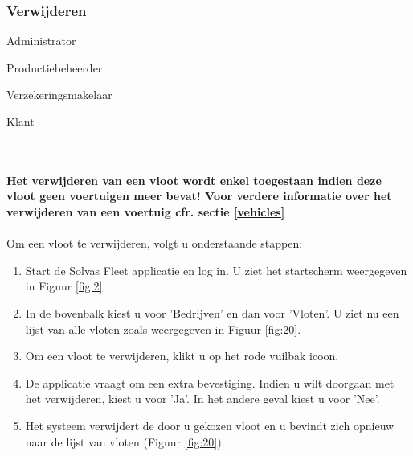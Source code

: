 \documentclass[11pt,openany]{article}
\newcommand{\cmark}{\ding{51}}%
\newcommand{\xmark}{\ding{55}}%
\newcommand{\done}{\rlap{$\square$}{\raisebox{2pt}{\large\hspace{1pt}\cmark}}%
	\hspace{-2.5pt}}
\newcommand{\wontfix}{\rlap{$\square$}{\large\hspace{1pt}\xmark}}
\begin{document}
\subsubsection{Verwijderen}
\begin{todolist}
	\item[\done] Administrator
	\item[\done] Productiebeheerder
	\item[\done] Verzekeringsmakelaar
	\item[\wontfix] Klant 
\end{todolist}
\\
\\
\textbf{Het verwijderen van een vloot wordt enkel toegestaan indien deze vloot geen voertuigen meer bevat! Voor verdere informatie over het verwijderen van een voertuig cfr. sectie \ref{vehicles}}
\\
\\
Om een vloot te verwijderen, volgt u onderstaande stappen:
\begin{enumerate}
	\item Start de Solvas Fleet applicatie en log in. U ziet het startscherm weergegeven in Figuur \ref{fig:2}.
	\item In de bovenbalk kiest u voor 'Bedrijven' en dan voor 'Vloten'. U ziet nu een lijst van alle vloten zoals weergegeven in Figuur \ref{fig:20}.
	\item Om een vloot te verwijderen, klikt u op het rode vuilbak icoon. 
	\item De applicatie vraagt om een extra bevestiging. Indien u wilt doorgaan met het verwijderen, kiest u voor 'Ja'. In het andere geval kiest u voor 'Nee'.
	\item Het systeem verwijdert de door u gekozen vloot en u bevindt zich opnieuw naar de lijst van vloten (Figuur \ref{fig:20}).
\end{enumerate}
\end{document}
